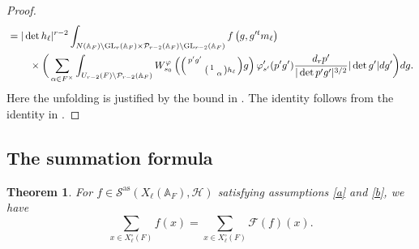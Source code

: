 \documentclass[12pt]{amsart}
\newtheorem{thm}{Theorem}[section]
\theoremstyle{remark}
\numberwithin{equation}{section}
\newcommand{\A}{\mathbb{A}}
\newcommand{\GL}{\mathrm{GL}}
\theoremstyle{definition}
\newenvironment{psmatrix}
  {\left(\begin{smallmatrix}}
  {\end{smallmatrix}\right)}
\numberwithin{equation}{subsection}
\begin{document}
\begin{proof}
\begin{align*}
 &= |\det h_\ell|^{r-2}\int_{N(\A_F) \backslash \GL_r(\A_F)\times \mathcal{P}_{r-2}(\A_F) \backslash \GL_{r-2}(\A_F)}  f\left(g,g'^{t}m_\ell\right) \\& \hspace{0.3in}\times \bigg(\sum_{\alpha \in F^\times} \int_{U_{r-2}(F)\backslash \mathcal{P}_{r-2}(\A_F)}W^\varphi_{s_0}\left(\begin{psmatrix} p'g' &  \\ & \begin{psmatrix}
     1 & \\ & \alpha 
 \end{psmatrix}h_\ell\end{psmatrix}g \right)\varphi'_{s'}(p'g')\frac{d_rp'}{|\det p'g'|^{3/2}}|\det g'|dg'\bigg)dg.
\end{align*}
Here the unfolding is justified by the bound in . The identity follows from the identity in 
.
\end{proof}

\subsection{The summation formula}

\begin{thm}
    For $f\in \mathcal{S}^{\mathrm{as}}(X_{\ell}(\A_F),\mathcal{H})$ satisfying assumptions \eqref{a} and \eqref{b}, we have
    \[
    \sum_{x \in X^\circ_{\ell}(F)}f\left(x\right) = \sum_{x \in X^\circ_{\ell}(F)}\mathcal{F}(f)\left(x\right).
    \]
\end{thm}
\end{document}
